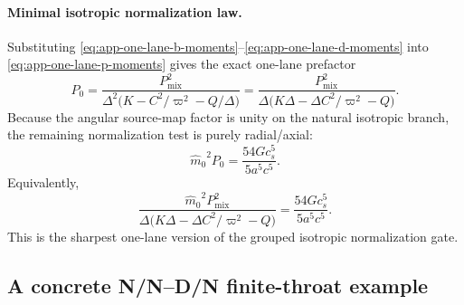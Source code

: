 \documentclass[11pt]{article}
\theoremstyle{definition}
\newcommand{\mhat}{\ensuremath{\hat m_0}}
\begin{document}
\paragraph{Minimal isotropic normalization law.}
Substituting \eqref{eq:app-one-lane-b-moments}--\eqref{eq:app-one-lane-d-moments} into \eqref{eq:app-one-lane-p-moments} gives the exact one-lane prefactor
\begin{equation}
 P_0
 =
 \frac{P_{\mathrm{mix}}^2}{\Delta^2\bigl(K-C^2/\varpi^2-Q/\Delta\bigr)}
 =
 \frac{P_{\mathrm{mix}}^2}{\Delta\bigl(K\Delta-\Delta C^2/\varpi^2-Q\bigr)}.
 \label{eq:app-one-lane-p0-closed}
\end{equation}
Because the angular source-map factor is unity on the natural isotropic branch, the remaining normalization test is purely radial/axial:
\begin{equation}
 \mhat^2 P_0 = \frac{54Gc_s^5}{5a^5c^5}.
 \label{eq:app-one-lane-normalization}
\end{equation}
Equivalently,
\begin{equation}
 \frac{\mhat^2 P_{\mathrm{mix}}^2}{\Delta\bigl(K\Delta-\Delta C^2/\varpi^2-Q\bigr)}
 =
 \frac{54Gc_s^5}{5a^5c^5}.
 \label{eq:app-one-lane-normalization-closed}
\end{equation}
This is the sharpest one-lane version of the grouped isotropic normalization gate.

\subsection{A concrete N/N--D/N finite-throat example}
\end{document}
